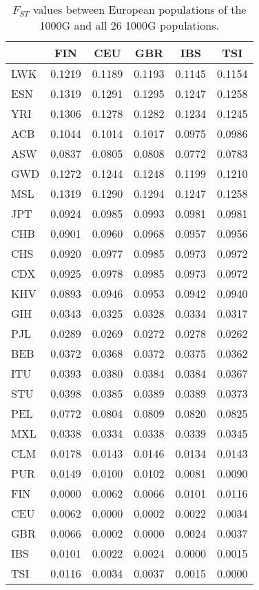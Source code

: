 \begin{table}[ht]
\centering
\caption{$F_{ST}$ values between European populations of the 1000G and all 26 1000G populations.} 
\label{tab:fst-EUR}
\begin{tabular}{|l|c|c|c|c|c|}
  \hline
 & FIN & CEU & GBR & IBS & TSI \\ 
  \hline
LWK & 0.1219 & 0.1189 & 0.1193 & 0.1145 & 0.1154 \\ 
  ESN & 0.1319 & 0.1291 & 0.1295 & 0.1247 & 0.1258 \\ 
  YRI & 0.1306 & 0.1278 & 0.1282 & 0.1234 & 0.1245 \\ 
  ACB & 0.1044 & 0.1014 & 0.1017 & 0.0975 & 0.0986 \\ 
  ASW & 0.0837 & 0.0805 & 0.0808 & 0.0772 & 0.0783 \\ 
  GWD & 0.1272 & 0.1244 & 0.1248 & 0.1199 & 0.1210 \\ 
  MSL & 0.1319 & 0.1290 & 0.1294 & 0.1247 & 0.1258 \\ 
   \hline
JPT & 0.0924 & 0.0985 & 0.0993 & 0.0981 & 0.0981 \\ 
  CHB & 0.0901 & 0.0960 & 0.0968 & 0.0957 & 0.0956 \\ 
  CHS & 0.0920 & 0.0977 & 0.0985 & 0.0973 & 0.0972 \\ 
  CDX & 0.0925 & 0.0978 & 0.0985 & 0.0973 & 0.0972 \\ 
  KHV & 0.0893 & 0.0946 & 0.0953 & 0.0942 & 0.0940 \\ 
   \hline
GIH & 0.0343 & 0.0325 & 0.0328 & 0.0334 & 0.0317 \\ 
  PJL & 0.0289 & 0.0269 & 0.0272 & 0.0278 & 0.0262 \\ 
  BEB & 0.0372 & 0.0368 & 0.0372 & 0.0375 & 0.0362 \\ 
  ITU & 0.0393 & 0.0380 & 0.0384 & 0.0384 & 0.0367 \\ 
  STU & 0.0398 & 0.0385 & 0.0389 & 0.0389 & 0.0373 \\ 
   \hline
PEL & 0.0772 & 0.0804 & 0.0809 & 0.0820 & 0.0825 \\ 
  MXL & 0.0338 & 0.0334 & 0.0338 & 0.0339 & 0.0345 \\ 
  CLM & 0.0178 & 0.0143 & 0.0146 & 0.0134 & 0.0143 \\ 
  PUR & 0.0149 & 0.0100 & 0.0102 & 0.0081 & 0.0090 \\ 
   \hline
FIN & 0.0000 & 0.0062 & 0.0066 & 0.0101 & 0.0116 \\ 
  CEU & 0.0062 & 0.0000 & 0.0002 & 0.0022 & 0.0034 \\ 
  GBR & 0.0066 & 0.0002 & 0.0000 & 0.0024 & 0.0037 \\ 
  IBS & 0.0101 & 0.0022 & 0.0024 & 0.0000 & 0.0015 \\ 
  TSI & 0.0116 & 0.0034 & 0.0037 & 0.0015 & 0.0000 \\ 
   \hline
\end{tabular}
\end{table}
